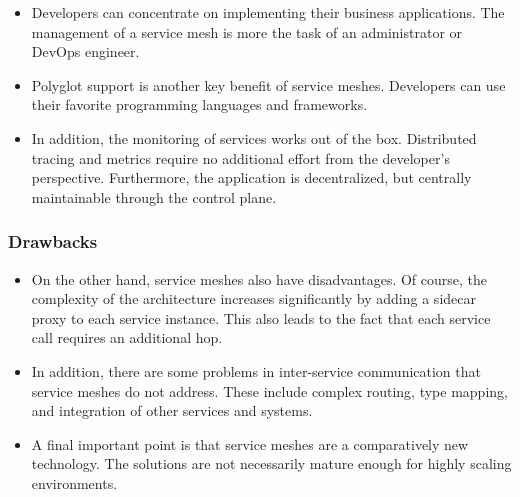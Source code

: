 \begin{itemize}

    \item Developers can concentrate on implementing their business applications. The management of a service mesh is more the task of an administrator or DevOps engineer.

    \item Polyglot support is another key benefit of service meshes. Developers can use their favorite programming languages and frameworks.

    \item In addition, the monitoring of services works out of the box. Distributed tracing and metrics require no additional effort from the developer's perspective. Furthermore, the application is decentralized, but centrally maintainable through the control plane. 

\end{itemize}
\subsubsection{Drawbacks}

\begin{itemize}
    \item On the other hand, service meshes also have disadvantages. Of course, the complexity of the architecture increases significantly by adding a sidecar proxy to each service instance. This also leads to the fact that each service call requires an additional hop.
    \item In addition, there are some problems in inter-service communication that service meshes do not address. These include complex routing, type mapping, and integration of other services and systems.
    \item A final important point is that service meshes are a comparatively new technology. The solutions are not necessarily mature enough for highly scaling environments.
\end{itemize}







